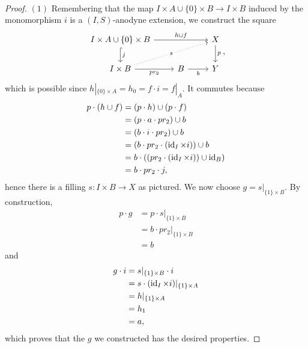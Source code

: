 \documentclass[a4paper,11pt,openany]{scrartcl}
\begin{document}
~\\
\begin{proof}
    $(1)$ Remembering that the map $I\times A\cup\{0\}\times B\rightarrow
    I\times B$ induced by the monomorphism $i$ is a $(I,S)$-anodyne extension,
    we construct the square
    \[\begin{tikzcd}
        {I\times A\cup\{0\}\times B} && X \\
        {I\times B} & B & Y
        \arrow["{h\cup f}", from=1-1, to=1-3]
        \arrow["{j}", hook, from=1-1, to=2-1]
        \arrow["{pr_2}"', from=2-1, to=2-2]
        \arrow["b"', from=2-2, to=2-3]
        \arrow["p", from=1-3, to=2-3]
        \arrow["s"{description}, dotted, from=2-1, to=1-3]
    \end{tikzcd},\]
    which is possible since $h|_{\{0\}\times A}=h_0=f\cdot i=f|_A$. It commutes
    because
    \begin{align*}
        p\cdot(h\cup f) &=(p\cdot h)\cup (p\cdot f) \\
        &=(p\cdot a\cdot pr_2)\cup b \\
        &=(b\cdot i\cdot pr_2)\cup b \\
        &=(b\cdot pr_2\cdot(\operatorname{id}_I\times i))\cup b \\
        &=b\cdot((pr_2\cdot(\operatorname{id}_I\times i))\cup\operatorname{id}_B) \\
        &=b\cdot pr_2\cdot j,
    \end{align*}
    hence there is a filling $s\colon I\times B\rightarrow X$ as pictured.
    We now choose $g=s|_{\{1\}\times B}$. By construction,
    \begin{align*}
        p\cdot g &=p\cdot s|_{\{1\}\times B} \\
        &=b\cdot pr_2|_{\{1\}\times B} \\
        &=b
    \end{align*}
    and
    \begin{align*}
        g\cdot i &=s|_{\{1\}\times B}\cdot i \\
        &=s\cdot(\operatorname{id}_I\times i)|_{\{1\}\times A} \\
        &=h|_{\{1\}\times A} \\
        &=h_1 \\
        &=a,
    \end{align*}
    which proves that the $g$ we constructed has the desired properties.


\end{proof}
\end{document}
